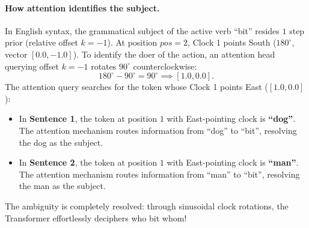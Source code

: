 \documentclass[../../main.tex]{subfiles}
\begin{document}
\paragraph{How attention identifies the subject.}
In English syntax, the grammatical subject of the active verb ``bit'' resides $1$ step prior (relative offset $k = -1$).
At position $pos = 2$, Clock 1 points South ($180^\circ$, vector $[0.0, -1.0]$).
To identify the doer of the action, an attention head querying offset $k = -1$ rotates $90^\circ$ counterclockwise:
\begin{equation}
180^\circ - 90^\circ = 90^\circ \implies [1.0, 0.0].
\end{equation}
The attention query searches for the token whose Clock 1 points East ($[1.0, 0.0]$):
\begin{itemize}
    \item In \textbf{Sentence 1}, the token at position $1$ with East-pointing clock is \textbf{``dog''}. The attention mechanism routes information from ``dog'' to ``bit'', resolving the dog as the subject.
    \item In \textbf{Sentence 2}, the token at position $1$ with East-pointing clock is \textbf{``man''}. The attention mechanism routes information from ``man'' to ``bit'', resolving the man as the subject.
\end{itemize}
The ambiguity is completely resolved: through sinusoidal clock rotations, the Transformer effortlessly deciphers who bit whom!

\clearpage
\thispagestyle{empty}
\null
\clearpage
\end{document}
